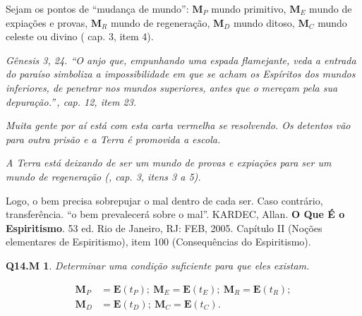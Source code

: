 \documentclass[12pt,a4paper]{article}
\begin{document}
			Sejam os pontos de \textquotedblleft mudan\c{c}a de mundo\textquotedblright: $ \mathbf{M}_P $ mundo primitivo, $ \mathbf{M}_E $ mundo de expia\c{c}\~oes e provas, $ \mathbf{M}_R $ mundo de regenera\c{c}\~ao, $ \mathbf{M}_D $ mundo ditoso, $ \mathbf{M}_C $ mundo celeste ou divino (\cite{ese} cap. 3, item 4).

			\emph{G\^enesis 3, 24. \textquotedblleft O anjo que, empunhando uma espada flamejante, veda a entrada do para\'iso simboliza a impossibilidade\cite{possibilidades} em que se acham os Esp\'iritos dos mundos inferiores, de penetrar nos mundos superiores, antes que o mere\c{c}am pela sua depura\c{c}\~ao.\textquotedblright\,\cite{genese}, cap. 12, item 23.}

			\begin{center}
			\end{center}

			\emph{Muita gente por a\'i est\'a com esta carta vermelha se resolvendo. Os detentos\cite{crime} v\~ao para outra pris\~ao e a Terra\cite{Terra} \'e promovida a escola.}

			\begin{center}
			\end{center}

			\emph{A Terra\cite{Terra} est\'a deixando de ser um mundo de provas e expia\c{c}\~oes para ser um mundo de regenera\c{c}\~ao (\cite{ese}, cap. 3, itens 3 a 5).}

Logo, o bem precisa sobrepujar o mal dentro de cada ser. Caso contr\'ario, transfer\^encia. \textquotedblleft o bem
prevalecer\'a sobre o mal\textquotedblright. KARDEC, Allan. \textbf{O Que \'E o Espiritismo}. 53  ed. Rio de Janeiro,
RJ: FEB, 2005. Cap\'itulo II (No\c{c}\~oes elementares de Espiritismo), item 100 (Consequ\^encias do Espiritismo).

			\begin{center}
			\end{center}

			\newtheorem{Q14.M}{Q14.M}
			\begin{Q14.M} Determinar uma condi\c{c}\~ao suficiente para que eles existam.
			\end{Q14.M}

			\begin{align*}
				\mathbf{M}_P &= \mathbf{E}\left(t_P\right); \
				\mathbf{M}_E = \mathbf{E}\left(t_E\right); \
				\mathbf{M}_R = \mathbf{E}\left(t_R\right); \\
				\mathbf{M}_D &= \mathbf{E}\left(t_D\right); \
				\mathbf{M}_C = \mathbf{E}\left(t_C\right).
			\end{align*}
\end{document}
